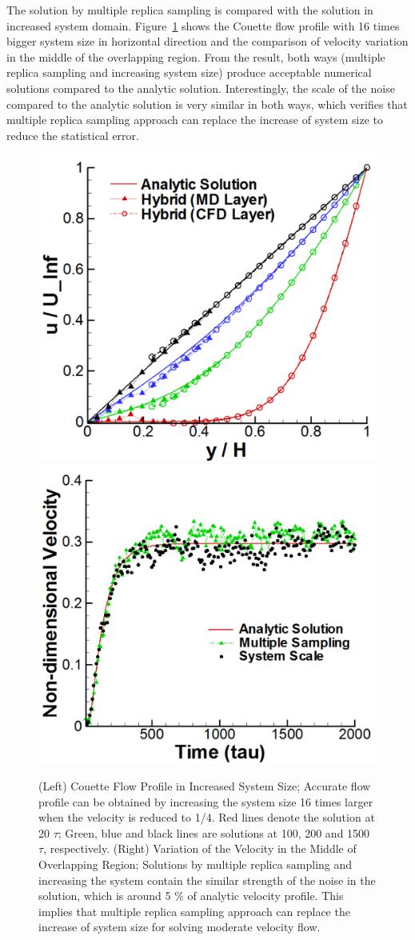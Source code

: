 \documentclass[preprint,12pt]{elsarticle}
\begin{document}
The solution by multiple replica sampling is compared with the solution in increased system domain. Figure~\ref{increase_system} shows the Couette flow profile with 16 times bigger system size in horizontal direction and the comparison of velocity variation in the middle of the overlapping region. From the result, both ways (multiple replica sampling and increasing system size) produce acceptable numerical solutions compared to the analytic solution. Interestingly, the scale of the noise compared to the analytic solution is very similar in both ways, which verifies that multiple replica sampling approach can replace the increase of system size to reduce the statistical error.

\begin{figure}
\centering
\includegraphics[width=0.6\linewidth]{Couette_025_Scale16.pdf}
\hskip 1cm
\includegraphics[width=0.6\linewidth]{Couette_025_Temporal_Multiset_VS_Scaleup.pdf}
\vskip-0.2cm
\caption{\small (Left) Couette Flow Profile in Increased System Size; Accurate flow profile can be obtained by increasing the system size 16 times larger when the velocity is reduced to 1/4. Red lines denote the solution at 20 $\tau$; Green, blue and black lines are solutions at 100, 200 and 1500 $\tau$, respectively. (Right) Variation of the Velocity in the Middle of Overlapping Region; Solutions by multiple replica sampling and increasing the system contain the similar strength of the noise in the solution, which is around 5 $\%$ of analytic velocity profile. This implies that multiple replica sampling approach can replace the increase of system size for solving moderate velocity flow.}
\label{increase_system}
\end{figure}
\end{document}
